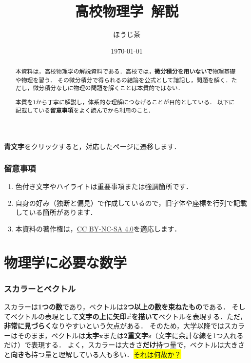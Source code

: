 \documentclass[a4paper,11pt]{ltjsarticle}
\title{\textbf{高校物理学\ 解説}}
\author{ほうじ茶}
\date{\today}
\begin{document}
\maketitle

\begin{abstract}
  本資料は，高校物理学の解説資料である．高校では，\textbf{微分積分を用いないで}物理基礎や物理を習う．
  その微分積分で得られるの結論を公式として諳記し，問題を解く．ただし，微分積分なしに物理の問題を解くことは本質的ではない．
  
  本質を1から丁寧に解説し，体系的な理解につなげることが目的としている．
  以下に記載している\textbf{留意事項}をよく読んでから利用のこと．
\end{abstract}

\tableofcontents

\vspace{12pt}

\begin{center}
  \textbf{\color{blue}青文字}をクリックすると，対応したページに遷移します．
\end{center}

\section*{留意事項}

\begin{enumerate}
  \item 色付き文字やハイライトは重要事項または強調箇所です．
  \item 自身の好み（独断と偏見）で作成しているので，旧字体や座標を行列で記載している箇所があります．
  \item 本資料の著作権は，\href{https://creativecommons.org/licenses/by-nc-sa/4.0}{CC BY-NC-SA 4.0}を適応します．
\end{enumerate}

\clearpage

\part{物理学に必要な数学}
\label{part: math}

\section{スカラーとベクトル}
\label{sec: sca-vec}

スカラーは\textbf{1つの数}であり，ベクトルは\textbf{2つ以上の数を束ねたもの}である．
そしてベクトルの表現として\textbf{文字の上に矢印$\vec{x}$を描いて}ベクトルを表現する．ただ，\textbf{非常に見づらく}なりやすいという欠点がある．
そのため，大学以降ではスカラーはそのまま，ベクトルは\textbf{太字}$\bm{x}$または\textbf{2重文字}$\mathbb{x}$（文字に余計な線を1つ入れるだけ）で表現する．
よく，スカラーは大きさ\textbf{だけ}持つ量で，ベクトルは大きさと\textbf{向きも}持つ量と理解している人も多い．\colorbox{yellow}{それは何故か？}
\end{document}
